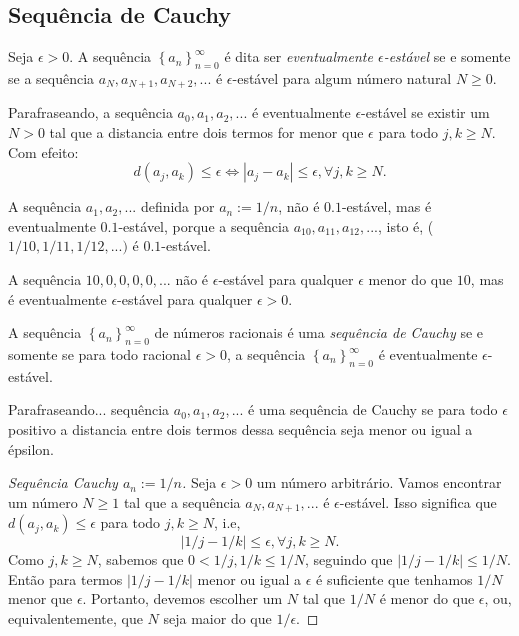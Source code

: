    \subsection{Sequência de Cauchy}
      \begin{definition}
         Seja $\epsilon > 0$. A sequência $\left\{a_{n}\right\}^{\infty}_{n=0}$ 
         é dita ser \emph{eventualmente $\epsilon$-estável} se e somente se
         a sequência $a_{N},a_{N+1},a_{N+2},...$ é $\epsilon$-estável
         para algum número natural $N \geq 0$.
      \end{definition}
      Parafraseando, a sequência $a_{0}, a_{1},a_{2},...$ é
      eventualmente $\epsilon$-estável se existir um $N > 0$
      tal que a distancia entre dois termos for menor que $\epsilon$
      para todo $j,k \geq N$. Com efeito:
      $$d(a_{j},a_{k}) \leq \epsilon \Leftrightarrow
      |a_{j} - a_{k} | \leq \epsilon, \forall j,k \geq N.$$
      \begin{exmp}
         A sequência $a_{1},a_{2},...$ definida por $a_{n} := 1/n$,
         não é $0.1$-estável, mas é eventualmente $0.1$-estável,
         porque a sequência $a_{10},a_{11},a_{12},...$, isto é,
         ($1/10,1/11,1/12,...)$ é $0.1$-estável.
      \end{exmp}
      \begin{exmp}
         A sequência $10,0,0,0,0,...$ não é $\epsilon$-estável
         para qualquer $\epsilon$ menor do que $10$, mas é
         eventualmente $\epsilon$-estável para qualquer $\epsilon > 0.$
      \end{exmp}
      \begin{definition}
         A sequência $\left\{a_{n}\right\}^{\infty}_{n=0}$
         de números racionais é uma \emph{sequência de Cauchy}
         se e somente se para todo racional $\epsilon > 0$, 
         a sequência $\left\{a_{n}\right\}^{\infty}_{n=0}$ é 
         eventualmente $\epsilon$-estável. 
      \end{definition} 
      Parafraseando... sequência $a_{0},a_{1},a_{2},...$ 
      é uma sequência de Cauchy se para todo $\epsilon$ 
      positivo a distancia entre dois termos dessa 
      sequência seja menor ou igual a épsilon.
      \begin{proof}[Sequência Cauchy $a_{n}:=1/n$]
         Seja $\epsilon > 0$ um número arbitrário. Vamos encontrar 
         um número $N \geq 1$ tal que a sequência $a_{N},a_{N+1},...$ 
         é $\epsilon$-estável. Isso significa que 
         $d(a_{j},a_{k}) \leq \epsilon$ para todo $j,k \geq N$, i.e,
         $$ |1/j - 1/k| \leq \epsilon, \forall j,k \geq N.$$
         Como $j,k \geq N$, sabemos que $0 < 1/j, 1/k \leq 1/N$, 
         seguindo que $ |1/j - 1/k| \leq 1/N$. Então para termos 
         $|1/j - 1/k|$ menor ou igual a $\epsilon$ é suficiente 
         que tenhamos $1/N$ menor que $\epsilon$. Portanto, 
         devemos escolher um $N$ tal que $1/N$ é menor do 
         que $\epsilon$, ou, equivalentemente, que $N$ 
         seja maior do que $1/\epsilon$.
      \end{proof}
